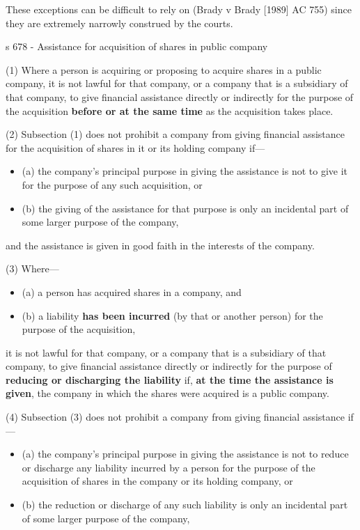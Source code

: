 \documentclass[
]{article}
\providecommand{\tightlist}{%
  \setlength{\itemsep}{0pt}\setlength{\parskip}{0pt}}
\newenvironment{env-99ba4262-5297-4318-9547-86307715f49a}
{
    \savenotes\tcolorbox[blanker,breakable,left=5pt,borderline west={2pt}{-4pt}{green}]
}
{
    \endtcolorbox\spewnotes
}
\begin{document}
These exceptions can be difficult to rely on (Brady v Brady {[}1989{]}
AC 755) since they are extremely narrowly construed by the courts.

\begin{env-99ba4262-5297-4318-9547-86307715f49a}

s 678 - Assistance for acquisition of shares in public company

(1) Where a person is acquiring or proposing to acquire shares in a
public company, it is not lawful for that company, or a company that is
a subsidiary of that company, to give financial assistance directly or
indirectly for the purpose of the acquisition \textbf{before or at the
same time} as the acquisition takes place.

(2) Subsection (1) does not prohibit a company from giving financial
assistance for the acquisition of shares in it or its holding company
if---

\begin{itemize}
\tightlist
\item
  (a) the company's principal purpose in giving the assistance is not to
  give it for the purpose of any such acquisition, or
\item
  (b) the giving of the assistance for that purpose is only an
  incidental part of some larger purpose of the company,
\end{itemize}

and the assistance is given in good faith in the interests of the
company.

(3) Where---

\begin{itemize}
\tightlist
\item
  (a) a person has acquired shares in a company, and
\item
  (b) a liability \textbf{has been incurred} (by that or another person)
  for the purpose of the acquisition,
\end{itemize}

it is not lawful for that company, or a company that is a subsidiary of
that company, to give financial assistance directly or indirectly for
the purpose of \textbf{reducing or discharging the liability} if,
\textbf{at the time the assistance is given}, the company in which the
shares were acquired is a public company.

(4) Subsection (3) does not prohibit a company from giving financial
assistance if---

\begin{itemize}
\tightlist
\item
  (a) the company's principal purpose in giving the assistance is not to
  reduce or discharge any liability incurred by a person for the purpose
  of the acquisition of shares in the company or its holding company, or
\item
  (b) the reduction or discharge of any such liability is only an
  incidental part of some larger purpose of the company,
\end{itemize}


\end{env-99ba4262-5297-4318-9547-86307715f49a}
\end{document}
